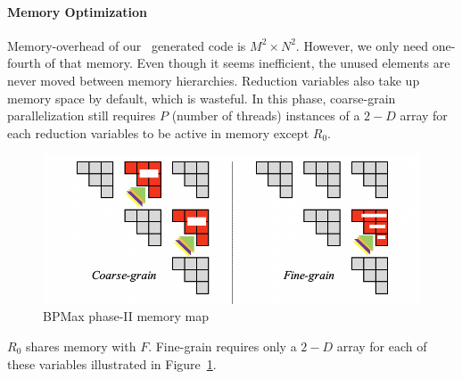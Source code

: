 \paragraph{Memory Optimization} 
Memory-overhead of our \alphaz\ generated code is $M^2 \times N^2$. However, we only need one-fourth of that memory. Even though it seems inefficient, the unused elements are never moved between memory hierarchies. Reduction variables also take up memory space by default, which is wasteful. In this phase, coarse-grain parallelization still requires $P$ (number of threads) instances of a $2-D$ array for each reduction variables to be active in memory except $R_{0}$.
\begin{figure}[htbp]
\begin{adjustbox}{varwidth=\textwidth,margin=0 {\abovecaptionskip} 0 0, frame=0.00pt}
\centerline{\includegraphics[scale=.585]{bpm_phase_2_memory_map.png}}
\end{adjustbox}
\caption{BPMax phase-II memory map}
\label{fig:bpm_phase_2_memory_map}
\end{figure}
$R_{0}$ shares memory with $F$. Fine-grain requires only a $2-D$ array for each of these variables illustrated in Figure~\ref{fig:bpm_phase_2_memory_map}.
 
